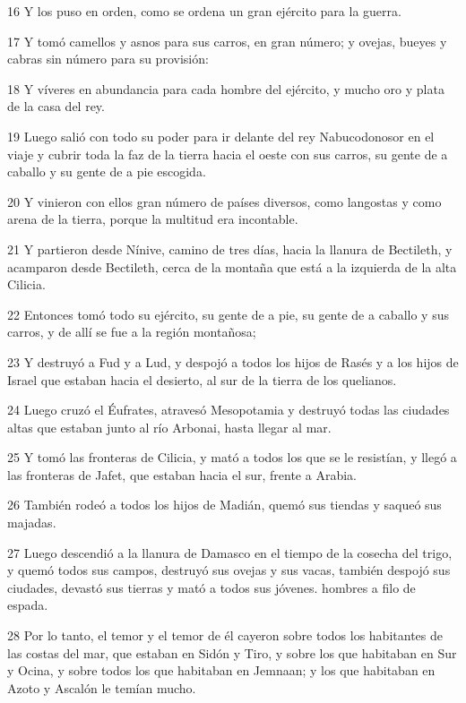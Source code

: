 \par 16 Y los puso en orden, como se ordena un gran ejército para la guerra.
\par 17 Y tomó camellos y asnos para sus carros, en gran número; y ovejas, bueyes y cabras sin número para su provisión:
\par 18 Y víveres en abundancia para cada hombre del ejército, y mucho oro y plata de la casa del rey.
\par 19 Luego salió con todo su poder para ir delante del rey Nabucodonosor en el viaje y cubrir toda la faz de la tierra hacia el oeste con sus carros, su gente de a caballo y su gente de a pie escogida.
\par 20 Y vinieron con ellos gran número de países diversos, como langostas y como arena de la tierra, porque la multitud era incontable.
\par 21 Y partieron desde Nínive, camino de tres días, hacia la llanura de Bectileth, y acamparon desde Bectileth, cerca de la montaña que está a la izquierda de la alta Cilicia.
\par 22 Entonces tomó todo su ejército, su gente de a pie, su gente de a caballo y sus carros, y de allí se fue a la región montañosa;
\par 23 Y destruyó a Fud y a Lud, y despojó a todos los hijos de Rasés y a los hijos de Israel que estaban hacia el desierto, al sur de la tierra de los quelianos.
\par 24 Luego cruzó el Éufrates, atravesó Mesopotamia y destruyó todas las ciudades altas que estaban junto al río Arbonai, hasta llegar al mar.
\par 25 Y tomó las fronteras de Cilicia, y mató a todos los que se le resistían, y llegó a las fronteras de Jafet, que estaban hacia el sur, frente a Arabia.
\par 26 También rodeó a todos los hijos de Madián, quemó sus tiendas y saqueó sus majadas.
\par 27 Luego descendió a la llanura de Damasco en el tiempo de la cosecha del trigo, y quemó todos sus campos, destruyó sus ovejas y sus vacas, también despojó sus ciudades, devastó sus tierras y mató a todos sus jóvenes. hombres a filo de espada.
\par 28 Por lo tanto, el temor y el temor de él cayeron sobre todos los habitantes de las costas del mar, que estaban en Sidón y Tiro, y sobre los que habitaban en Sur y Ocina, y sobre todos los que habitaban en Jemnaan; y los que habitaban en Azoto y Ascalón le temían mucho.

